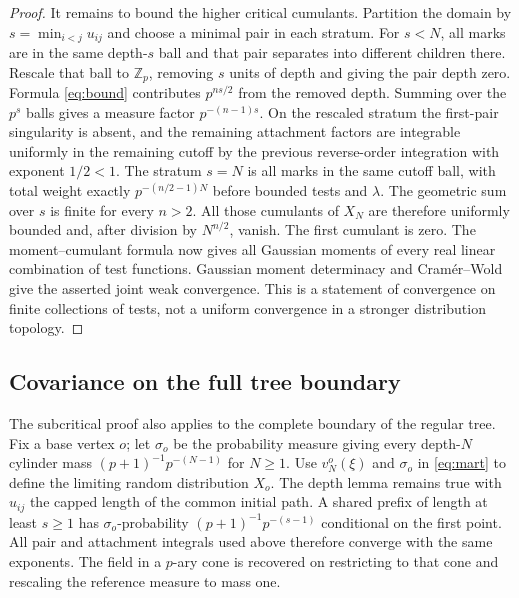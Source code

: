 \documentclass[11pt]{article}
\theoremstyle{remark}
\newcommand{\Zp}{\mathbb Z_p}
\begin{document}
\begin{proof}
It remains to bound the higher critical cumulants. Partition the domain by \(s=\min_{i<j}u_{ij}\) and choose a minimal pair in each stratum. For \(s<N\), all marks are in the same depth-\(s\) ball and that pair separates into different children there. Rescale that ball to \(\Zp\), removing \(s\) units of depth and giving the pair depth zero. Formula \eqref{eq:bound} contributes \(p^{ns/2}\) from the removed depth. Summing over the \(p^s\) balls gives a measure factor \(p^{-(n-1)s}\). On the rescaled stratum the first-pair singularity is absent, and the remaining attachment factors are integrable uniformly in the remaining cutoff by the previous reverse-order integration with exponent \(1/2<1\). The stratum \(s=N\) is all marks in the same cutoff ball, with total weight exactly \(p^{-(n/2-1)N}\) before bounded tests and \(\lambda\). The geometric sum over \(s\) is finite for every \(n>2\). All those cumulants of \(X_N\) are therefore uniformly bounded and, after division by \(N^{n/2}\), vanish. The first cumulant is zero. The moment--cumulant formula now gives all Gaussian moments of every real linear combination of test functions. Gaussian moment determinacy and Cram\'er--Wold give the asserted joint weak convergence. This is a statement of convergence on finite collections of tests, not a uniform convergence in a stronger distribution topology.
\end{proof}


\subsection{Covariance on the full tree boundary}

The subcritical proof also applies to the complete boundary of the regular tree. Fix a base vertex \(o\); let \(\sigma_o\) be the probability measure giving every depth-\(N\) cylinder mass \((p+1)^{-1}p^{-(N-1)}\) for \(N\ge1\). Use \(v^o_N(\xi)\) and \(\sigma_o\) in \eqref{eq:mart} to define the limiting random distribution \(X_o\). The depth lemma remains true with \(u_{ij}\) the capped length of the common initial path. A shared prefix of length at least \(s\ge1\) has \(\sigma_o\)-probability \((p+1)^{-1}p^{-(s-1)}\) conditional on the first point. All pair and attachment integrals used above therefore converge with the same exponents. The field in a \(p\)-ary cone is recovered on restricting to that cone and rescaling the reference measure to mass one.
\end{document}
